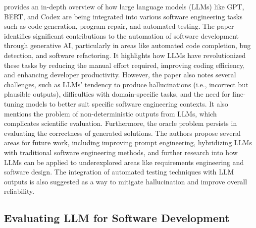 \citet{fan2023large} provides an in-depth overview of how large language models (LLMs) like GPT, BERT, and Codex are being integrated into various software engineering tasks such as code generation, program repair, and automated testing. The paper identifies significant contributions to the automation of software development through generative AI, particularly in areas like automated code completion, bug detection, and software refactoring. It highlights how LLMs have revolutionized these tasks by reducing the manual effort required, improving coding efficiency, and enhancing developer productivity. However, the paper also notes several challenges, such as LLMs’ tendency to produce hallucinations (i.e., incorrect but plausible outputs), difficulties with domain-specific tasks, and the need for fine-tuning models to better suit specific software engineering contexts. It also mentions the problem of non-deterministic outputs from LLMs, which complicates scientific evaluation. Furthermore, the oracle problem persists in evaluating the correctness of generated solutions. The authors propose several areas for future work, including improving prompt engineering, hybridizing LLMs with traditional software engineering methods, and further research into how LLMs can be applied to underexplored areas like requirements engineering and software design. The integration of automated testing techniques with LLM outputs is also suggested as a way to mitigate hallucination and improve overall reliability.

\subsection{Evaluating LLM for Software Development}

